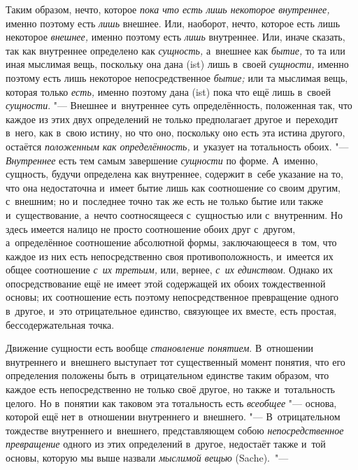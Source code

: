 Таким образом, нечто, которое {\em пока что есть лишь
некоторое внутреннее,} именно поэтому есть {\em лишь}
внешнее. Или, наоборот, нечто, которое есть лишь некоторое
{\em внешнее,} именно поэтому есть
{\em лишь} внутреннее. Или, иначе сказать, так как
внутреннее определено как {\em сущность,} а~внешнее как
{\em бытие,} то та или иная мыслимая вещь, поскольку
она дана (ist) лишь в~своей {\em сущности,} именно
поэтому есть лишь некоторое непосредственное
{\em бытие;} или та мыслимая вещь, которая только
{\em есть,} именно поэтому дана (ist) пока что ещё лишь
в~своей {\em сущности}. "--- Внешнее и~внутреннее суть
определённость, положенная так, что каждое из этих двух определений не
только предполагает другое и~переходит в~него, как в~свою истину, но что
оно, поскольку оно есть эта истина другого, остаётся
{\em положенным как определённость,} и~указует на
тотальность обоих. "--- {\em Внутреннее} есть тем самым
завершение {\em сущности} по форме. А~именно, сущность,
будучи определена как внутреннее, содержит в~себе указание на то, что она
недостаточна и~имеет бытие лишь как соотношение со своим другим, с~внешним;
но и~последнее точно так же есть не только бытие или также и~существование,
а~нечто соотносящееся с~сущностью или с~внутренним. Но здесь имеется налицо
не просто соотношение обоих друг с~другом, а~определённое соотношение
абсолютной формы, заключающееся в~том, что каждое из них есть
непосредственно своя противоположность, и~имеется их общее соотношение
{\em с~их третьим,} или, вернее,
{\em с~их единством}. Однако их опосредствование ещё не
имеет этой содержащей их обоих тождественной основы; их соотношение есть
поэтому непосредственное превращение одного в~другое, и~это отрицательное
единство, связующее их вместе, есть простая, бессодержательная точка.


Движение сущности есть вообще {\em становление
понятием}. В~отношении внутреннего и~внешнего выступает тот существенный
момент понятия, что его определения положены быть в~отрицательном единстве
таким образом, что каждое есть непосредственно не только своё другое, но
также и~тотальность целого. Но в~понятии как таковом эта тотальность есть
{\em всеобщее} "--- основа, которой ещё нет в~отношении
внутреннего и~внешнего. "--- В~отрицательном тождестве внутреннего и~внешнего,
представляющем собою {\em непосредственное превращение}
одного из этих определений в~другое, недостаёт также и~той основы, которую
мы выше назвали {\em мыслимой вещью} (Sache).~"---

